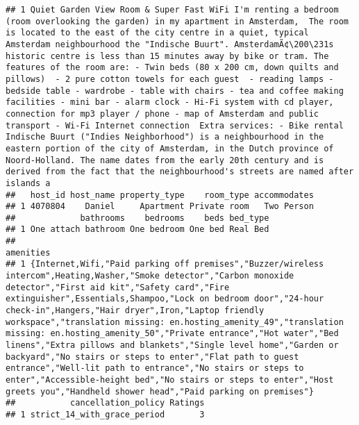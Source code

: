 \documentclass[]{article}
\begin{document}
\begin{verbatim}
## 1 Quiet Garden View Room & Super Fast WiFi I'm renting a bedroom (room overlooking the garden) in my apartment in Amsterdam,  The room is located to the east of the city centre in a quiet, typical Amsterdam neighbourhood the "Indische Buurt". AmsterdamÃ¢\200\231s historic centre is less than 15 minutes away by bike or tram. The features of the room are: - Twin beds (80 x 200 cm, down quilts and pillows)  - 2 pure cotton towels for each guest  - reading lamps - bedside table - wardrobe - table with chairs - tea and coffee making facilities - mini bar - alarm clock - Hi-Fi system with cd player, connection for mp3 player / phone - map of Amsterdam and public transport - Wi-Fi Internet connection  Extra services: - Bike rental Indische Buurt ("Indies Neighborhood") is a neighbourhood in the eastern portion of the city of Amsterdam, in the Dutch province of Noord-Holland. The name dates from the early 20th century and is derived from the fact that the neighbourhood's streets are named after islands a
##   host_id host_name property_type    room_type accommodates
## 1 4070804    Daniel     Apartment Private room   Two Person
##             bathrooms    bedrooms    beds bed_type
## 1 One attach bathroom One bedroom One bed Real Bed
##                                                                                                                                                                                                                                                                                                                                                                                                                                                                                                                                                                                                                                                                                                                                                            amenities
## 1 {Internet,Wifi,"Paid parking off premises","Buzzer/wireless intercom",Heating,Washer,"Smoke detector","Carbon monoxide detector","First aid kit","Safety card","Fire extinguisher",Essentials,Shampoo,"Lock on bedroom door","24-hour check-in",Hangers,"Hair dryer",Iron,"Laptop friendly workspace","translation missing: en.hosting_amenity_49","translation missing: en.hosting_amenity_50","Private entrance","Hot water","Bed linens","Extra pillows and blankets","Single level home","Garden or backyard","No stairs or steps to enter","Flat path to guest entrance","Well-lit path to entrance","No stairs or steps to enter","Accessible-height bed","No stairs or steps to enter","Host greets you","Handheld shower head","Paid parking on premises"}
##           cancellation_policy Ratings
## 1 strict_14_with_grace_period       3
\end{verbatim}
\end{document}
